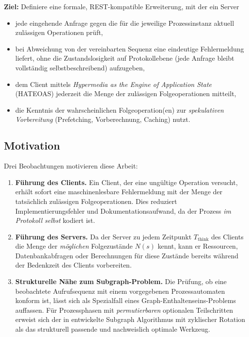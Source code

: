 ﻿\documentclass[a4paper,12pt]{article}
\theoremstyle{definition}
\begin{document}
\textbf{Ziel:} Definiere eine formale, REST-kompatible Erweiterung, mit der ein Server
\begin{itemize}
	\item jede eingehende Anfrage gegen die für die jeweilige Prozessinstanz aktuell
	      zulässigen Operationen prüft,
	\item bei Abweichung von der vereinbarten Sequenz eine eindeutige Fehlermeldung liefert,
	      ohne die Zustandslosigkeit auf Protokollebene (jede Anfrage bleibt vollständig
	      selbstbeschreibend) aufzugeben,
	\item dem Client mittels \emph{Hypermedia as the Engine of Application State}
	      (HATEOAS) jederzeit die Menge der zulässigen Folgeoperationen mitteilt,
	\item die Kenntnis der wahrscheinlichen Folgeoperation(en) zur \emph{spekulativen
	      Vorbereitung} (Prefetching, Vorberechnung, Caching) nutzt.
\end{itemize}

\subsection{Motivation}

Drei Beobachtungen motivieren diese Arbeit:

\begin{enumerate}
	\item \textbf{Führung des Clients.} Ein Client, der eine ungültige Operation
	      versucht, erhält sofort eine maschinenlesbare Fehlermeldung mit der Menge der
	      tatsächlich zulässigen Folgeoperationen. Dies reduziert Implementierungsfehler
	      und Dokumentationsaufwand, da der Prozess \emph{im Protokoll selbst} kodiert ist.
	\item \textbf{Führung des Servers.} Da der Server zu jedem Zeitpunkt $T_{\text{think}}$
	      des Clients die Menge der \emph{möglichen} Folgezustände $N(s)$ kennt, kann er
	      Ressourcen, Datenbankabfragen oder Berechnungen für diese Zustände bereits während
	      der Bedenkzeit des Clients vorbereiten.
	\item \textbf{Strukturelle Nähe zum Subgraph-Problem.} Die Prüfung, ob eine beobachtete
	      Aufrufsequenz mit einem vorgegebenen Prozessautomaten konform ist, lässt sich als
	      Spezialfall eines Graph-Enthaltenseins-Problems auffassen. Für Prozessphasen mit
	      \emph{permutierbaren} optionalen Teilschritten erweist sich der in
	      \cite{epp2026subgraph} entwickelte Subgraph Algorithmus mit zyklischer Rotation
	      als das strukturell passende und nachweislich optimale Werkzeug.
\end{enumerate}
\end{document}
